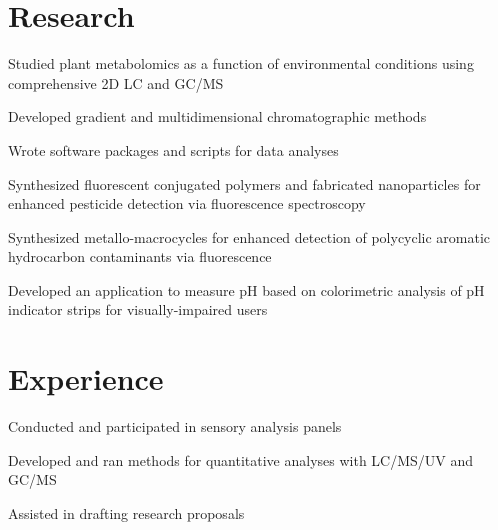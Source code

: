 \documentclass[]{deedy-resume-openfont}
\begin{document}
\begin{minipage}[t]{0.7\textwidth}

\section{Research}
\vspace{\topsep}
\begin{tightemize}
\item Studied plant metabolomics as a function of environmental conditions
using comprehensive 2D LC and GC/MS
\item Developed gradient and multidimensional chromatographic methods
\item Wrote software packages and scripts for data analyses
\end{tightemize}
\sectionsep

\begin{tightemize}
\item Synthesized fluorescent conjugated polymers and fabricated nanoparticles
for enhanced pesticide detection via fluorescence spectroscopy
\item Synthesized metallo-macrocycles for enhanced
detection of polycyclic aromatic hydrocarbon contaminants via fluorescence
\end{tightemize}
\sectionsep

\begin{tightemize}
\item Developed an application to measure pH based on colorimetric analysis of
pH indicator strips for visually-impaired users
\end{tightemize}

\section{Experience}

\begin{tightemize}
\item Conducted and participated in sensory analysis panels
\item Developed and ran methods for quantitative analyses with LC/MS/UV
    and GC/MS
\item Assisted in drafting research proposals
\end{tightemize}
\sectionsep


\end{minipage}
\end{document}
